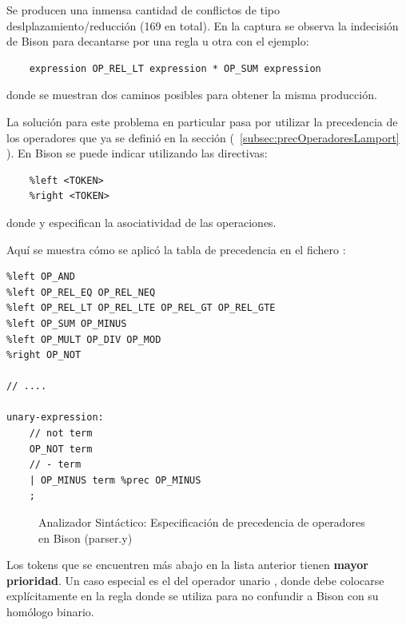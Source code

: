 Se producen una inmensa cantidad de conflictos de tipo deslplazamiento/reducción (169 en total). En la captura se observa la indecisión de Bison para decantarse por una regla u otra con el ejemplo:

\begin{verbatim}
    expression OP_REL_LT expression * OP_SUM expression
\end{verbatim}

\noindent
donde se muestran dos caminos posibles para obtener la misma producción.

\vspace{0.5cm}

La solución para este problema en particular pasa por utilizar la precedencia de los operadores que ya se definió en la sección (~\ref{subsec:precOperadoresLamport} ). En Bison se puede indicar utilizando las directivas:

\begin{verbatim}
    %left <TOKEN>
    %right <TOKEN>
\end{verbatim}

\noindent
donde  y  especifican la asociatividad de las operaciones.

\vspace{0.5cm}

\noindent
Aquí se muestra cómo se aplicó la tabla de precedencia en el fichero :
\begin{lstlisting}[style=customflex]
%left OP_OR
%left OP_AND
%left OP_REL_EQ OP_REL_NEQ
%left OP_REL_LT OP_REL_LTE OP_REL_GT OP_REL_GTE
%left OP_SUM OP_MINUS
%left OP_MULT OP_DIV OP_MOD
%right OP_NOT

// ....

unary-expression:
    // not term
    OP_NOT term
    // - term
    | OP_MINUS term %prec OP_MINUS
    ;

\end{lstlisting}
\begin{figure}[h]
\caption{Analizador Sintáctico: Especificación de precedencia de operadores en Bison (parser.y)}
\label{fig:bisonPrecOperators}
\end{figure}

Los tokens que se encuentren más abajo en la lista anterior tienen \textbf{mayor prioridad}. Un caso especial es el del operador unario \code{-}, donde debe colocarse explícitamente en la regla donde se utiliza para no confundir a Bison con su homólogo binario.

\vspace{0.5cm}

